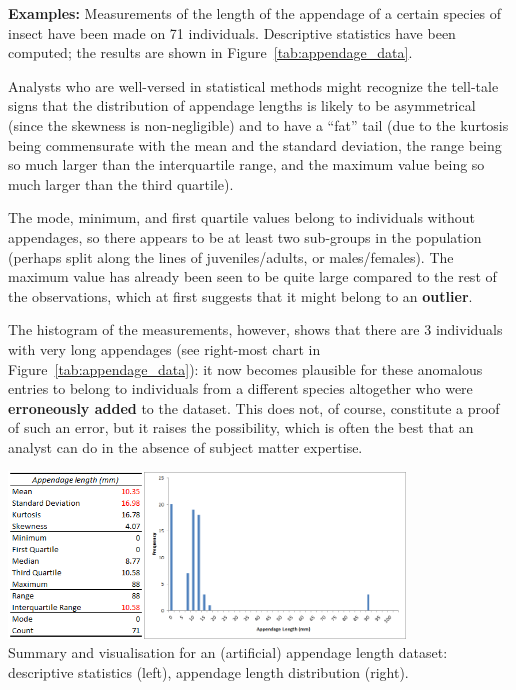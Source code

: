\documentclass[20pt,landscape,footrule,headrule]{foils}
\begin{document}
\textbf{Examples:} Measurements of the length of the appendage of a certain species of insect have been made on 71 individuals. Descriptive statistics have been computed; the results are shown in Figure~\ref{tab:appendage_data}.

\newpage\noindent Analysts who are well-versed in statistical methods might recognize the tell-tale signs that the distribution of appendage lengths is likely to be asymmetrical (since the skewness is non-negligible) and to have a ``fat'' tail (due to the kurtosis being commensurate with the mean and the standard deviation, the range being so much larger than the interquartile range, and the maximum value being so much larger than the third quartile). \par The mode, minimum, and first quartile values belong to individuals without appendages, so there appears to be at least two sub-groups in the population (perhaps split along the lines of juveniles/adults, or males/females). The maximum value has already been seen to be quite large compared to the rest of the observations, which at first suggests that it might belong to an \textbf{outlier}. \par The histogram of the measurements, however, shows that there are 3 individuals with very long appendages (see right-most chart in Figure~\ref{tab:appendage_data}): it now becomes plausible for these anomalous entries to belong to individuals from a different species altogether who were \textbf{erroneously added} to the dataset. This does not, of course, constitute a proof of such an error, but it raises the possibility, which is often the best that an analyst can do in the absence of subject matter expertise.




\begin{center}\includegraphics[width=0.27\textwidth]{Images/appendage_length_descriptive_EN}\quad \includegraphics[width=0.52\textwidth]{Images/appendage_length_EN}\\ Summary and visualisation for an (artificial) appendage length dataset: descriptive statistics (left), appendage length distribution (right).
\end{center}  
\end{document}
